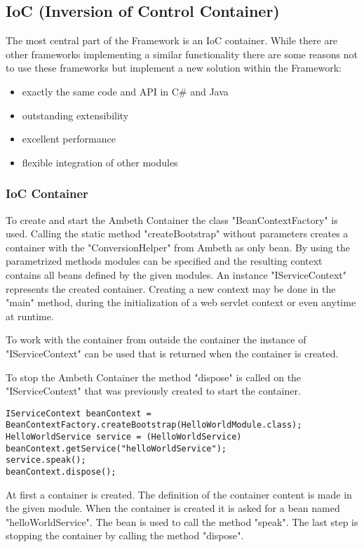 \subsection{IoC (Inversion of Control Container)}
The most central part of the \AMBETH{} Framework is an IoC container. While there are other frameworks implementing a similar functionality there are some reasons not to use these frameworks but implement a new solution within the \AMBETH{} Framework:

\begin{itemize}
	\item exactly the same code and API in C\# and Java
	\item outstanding extensibility
	\item excellent performance
	\item flexible integration of other \AMBETH{} modules
\end{itemize}

\subsubsection{IoC Container}
\TODO

To create and start the Ambeth Container the class "BeanContextFactory" is used. Calling the static method "createBootstrap" without parameters creates a container with the "ConversionHelper" from Ambeth as only bean. By using the parametrized methods modules can be specified and the resulting context contains all beans defined by the given modules. An instance "IServiceContext" represents the created container.
Creating a new context may be done in the "main" method, during the initialization of a web servlet context or even anytime at runtime.

To work with the container from outside the container the instance of "IServiceContext" can be used that is returned when the container is created.

To stop the Ambeth Container the method "dispose" is called on the "IServiceContext" that was previously created to start the container.


\begin{lstlisting}[style=Java,caption={Start, use and stop an Ambeth Bean Container}]
IServiceContext beanContext = BeanContextFactory.createBootstrap(HelloWorldModule.class);
HelloWorldService service = (HelloWorldService) beanContext.getService("helloWorldService");
service.speak();
beanContext.dispose();
\end{lstlisting}
At first a container is created. The definition of the container content is made in the given module. When the container is created it is asked for a bean named "helloWorldService". The bean is used to call the method "speak". The last step is stopping the container by calling the method "dispose".

